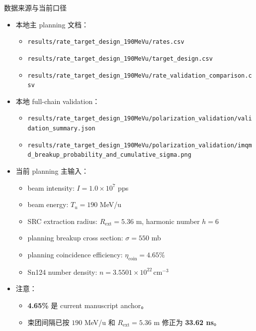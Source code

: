 \documentclass[aspectratio=169]{ctexbeamer}
\begin{document}
\begin{frame}{数据来源与当前口径}
\small
\begin{itemize}
  \item 本地主 planning 文档：
  \begin{itemize}
    \item \texttt{results/rate\_target\_design\_190MeVu/rates.csv}
    \item \texttt{results/rate\_target\_design\_190MeVu/target\_design.csv}
    \item \texttt{results/rate\_target\_design\_190MeVu/rate\_validation\_comparison.csv}
  \end{itemize}
  \item 本地 full-chain validation：
  \begin{itemize}
    \item \texttt{results/rate\_target\_design\_190MeVu/polarization\_validation/validation\_summary.json}
    \item \texttt{results/rate\_target\_design\_190MeVu/polarization\_validation/imqmd\_breakup\_probability\_and\_cumulative\_sigma.png}
  \end{itemize}
  \item 当前 planning 主输入：
  \begin{itemize}
    \item beam intensity: $I = 1.0\times 10^7$ pps
    \item beam energy: $T_u = 190$ MeV/u
    \item SRC extraction radius: $R_{\mathrm{ext}} = 5.36$ m, harmonic number $h = 6$
    \item planning breakup cross section: $\sigma = 550$ mb
    \item planning coincidence efficiency: $\eta_{\mathrm{coin}} = 4.65\%$
    \item Sn124 number density: $n = 3.5501\times 10^{22}\,\mathrm{cm}^{-3}$
  \end{itemize}
  \item 注意：
  \begin{itemize}
    \item \textbf{4.65\%} 是 current manuscript anchor。
    \item 束团间隔已按 $190$ MeV/u 和 $R_{\mathrm{ext}} = 5.36$ m 修正为 \textbf{33.62 ns}。
  \end{itemize}
\end{itemize}
\end{frame}
\end{document}
